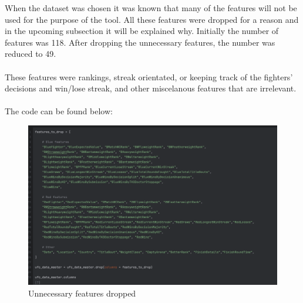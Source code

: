 \documentclass{article}
\begin{document}
  When the dataset was chosen it was known that many of the features will not be used for the purpose of the tool. All these features were dropped for a reason and in the 
  upcoming subsection it will be explained why. Initially the number of features was 118. After dropping the unnecessary features, the number was reduced to 49.\\\\ 
  These features were rankings, streak orientated, or keeping track of the fighters' decisions and win/lose streak, and other miscelanous features that are irrelevant.\\\\ 
  The code can be found below:\\
  	\begin{figure}[H]
  	\centering
  	\includegraphics[width=1\textwidth]{images/Features_Dropped.png}
  	\caption{Unnecessary features dropped}
  \end{figure}
\end{document}
